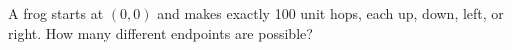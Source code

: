 A frog starts at $(0,0)$ and makes exactly 100 unit hops, each up, down, left, or right. How many different endpoints are possible?
